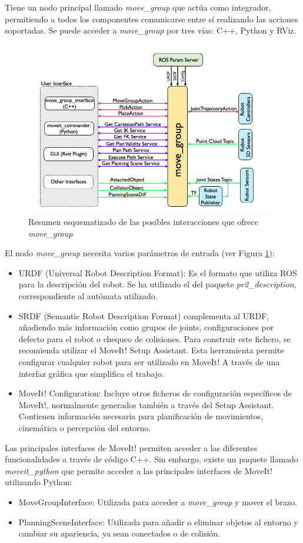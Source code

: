 \documentclass[12pt,spanish,chapterprefix, numbers=noenddot]{book}
\numberwithin{equation}{section}
\numberwithin{figure}{section}
\begin{document}
Tiene un nodo principal llamado \textit{move\_group } que actúa como integrador, permitiendo a todos los componentes comunicarse entre sí realizando las acciones soportadas. 
Se puede acceder a \textit{move\_group } por tres vías: C++, Python y RViz.
\begin{figure}[hbt!]
\centering
\includegraphics[width=12cm]{Figs/moveGroup.png}
\par
\caption{\label{fig:moveGroup}Resumen esquematizado de las posibles interacciones que ofrece \textit{move\_group}}
\end{figure}
El nodo \textit{move\_group} necesita varios parámetros de entrada (ver Figura \ref{fig:moveGroup}):
\begin{itemize}
\item URDF (Universal Robot Description Format): Es el formato que utiliza ROS para la descripción del robot. Se ha utilizado el del paquete \textit{pr2\_description}, correspondiente al autómata utilizado.
\item SRDF (Semantic Robot Description Format) complementa al URDF, añadiendo más información como grupos de joints, configuraciones por defecto para el robot o chequeo de colisiones. Para construir este fichero, se recomienda utilizar el MoveIt! Setup Assistant. Esta herramienta permite configurar cualquier robot para ser utilizado en MoveIt! A través de una interfaz gráfica que simplifica el trabajo. 
\item MoveIt! Configuration: Incluye otros ficheros de configuración específicos de MoveIt!, normalmente generados también a través del Setup Assistant. Contienen información necesaria para planificación de movimientos, cinemática o percepción del entorno.
\end{itemize}
Las principales interfaces de MoveIt! permiten acceder a las diferentes funcionalidades a través de código C++. Sin embargo, existe un paquete llamado \textit{moveit\_python} que permite acceder a las principales interfaces de MoveIt! utilizando Python:
\begin{itemize}
\item MoveGroupInterface: Utilizada para acceder a \textit{move\_group } y mover el brazo. 
\item PlanningSceneInterface: Utilizada para añadir o eliminar objetos al entorno y cambiar su apariencia, ya sean conectados o de colisión. 
\end{itemize}
\end{document}
